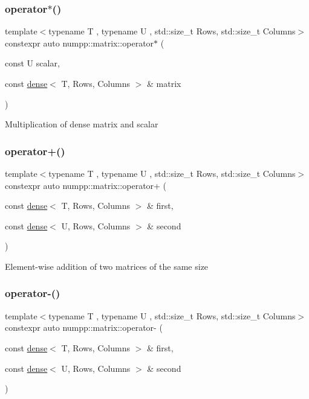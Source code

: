 \subsubsection{\texorpdfstring{operator$\ast$()}{operator*()}\hspace{0.1cm}{\footnotesize\ttfamily [3/3]}}
{\footnotesize\ttfamily template$<$typename T , typename U , std\+::size\+\_\+t Rows, std\+::size\+\_\+t Columns$>$ \\
constexpr auto numpp\+::matrix\+::operator$\ast$ (\begin{DoxyParamCaption}\item[{const U}]{scalar,  }\item[{const \hyperlink{classnumpp_1_1matrix_1_1dense}{dense}$<$ T, Rows, Columns $>$ \&}]{matrix }\end{DoxyParamCaption})}

Multiplication of dense matrix and scalar\mbox{\label{group__numpp__structures__matrices__dense_ga9fdd727151e15fa8f6a806b9828d06d4}} 
\subsubsection{\texorpdfstring{operator+()}{operator+()}}
{\footnotesize\ttfamily template$<$typename T , typename U , std\+::size\+\_\+t Rows, std\+::size\+\_\+t Columns$>$ \\
constexpr auto numpp\+::matrix\+::operator+ (\begin{DoxyParamCaption}\item[{const \hyperlink{classnumpp_1_1matrix_1_1dense}{dense}$<$ T, Rows, Columns $>$ \&}]{first,  }\item[{const \hyperlink{classnumpp_1_1matrix_1_1dense}{dense}$<$ U, Rows, Columns $>$ \&}]{second }\end{DoxyParamCaption})}

Element-\/wise addition of two matrices of the same size\mbox{\label{group__numpp__structures__matrices__dense_ga1a99075b6985b2ccafb41a6d9ad91824}} 
\subsubsection{\texorpdfstring{operator-\/()}{operator-()}}
{\footnotesize\ttfamily template$<$typename T , typename U , std\+::size\+\_\+t Rows, std\+::size\+\_\+t Columns$>$ \\
constexpr auto numpp\+::matrix\+::operator-\/ (\begin{DoxyParamCaption}\item[{const \hyperlink{classnumpp_1_1matrix_1_1dense}{dense}$<$ T, Rows, Columns $>$ \&}]{first,  }\item[{const \hyperlink{classnumpp_1_1matrix_1_1dense}{dense}$<$ U, Rows, Columns $>$ \&}]{second }\end{DoxyParamCaption})}

